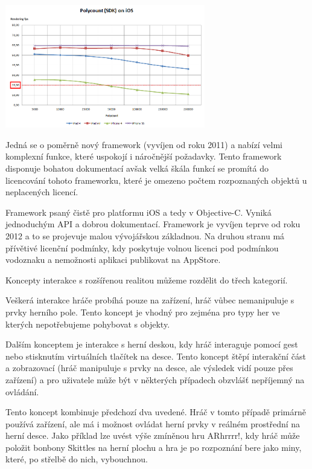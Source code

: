 \documentclass[oneside,12pt]{article}
\begin{document}
    \includegraphics[width=330px, left]{Polycount_SDK_iOS_20fps.png}

Jedná se o poměrně nový framework (vyvíjen od roku 2011) a nabízí velmi komplexní funkce, které uspokojí i náročnější požadavky. Tento framework disponuje bohatou dokumentací avšak velká škála funkcí se promítá do licencování tohoto frameworku, které je omezeno počtem rozpoznaných objektů u neplacených licencí.

Framework psaný čistě pro platformu iOS a tedy v Objective-C. Vyniká jednoduchým API a dobrou dokumentací. Framework je vyvíjen teprve od roku 2012 a to se projevuje malou vývojářskou základnou. Na druhou stranu má přívětivé licenční podmínky, kdy poskytuje volnou licenci pod podmínkou vodoznaku a nemožnosti aplikaci publikovat na AppStore.

Koncepty interakce s rozšířenou realitou můžeme rozdělit do třech kategorií.

Veškerá interakce hráče probíhá pouze na zařízení, hráč vůbec nemanipuluje s prvky herního pole. Tento koncept je vhodný pro zejména pro typy her ve kterých nepotřebujeme pohybovat s objekty.

Dalším konceptem je interakce s herní deskou, kdy hráč interaguje pomocí gest nebo stisknutím virtuálních tlačítek na desce. Tento koncept štěpí interakční část a zobrazovací (hráč manipuluje s prvky na desce, ale výsledek vidí pouze přes zařízení) a pro uživatele může být v některých případech obzvlášť nepříjemný na ovládání.

Tento koncept kombinuje předchozí dva uvedené. Hráč v tomto případě primárně používá zařízení, ale má i možnost ovládat herní prvky v reálném prostřední na herní desce. Jako příklad lze uvést výše zmíněnou hru ARhrrrr!, kdy hráč může položit bonbony Skittles na herní plochu a hra je po rozpoznání bere jako miny, které, po střelbě do nich, vybouchnou.
\end{document}
